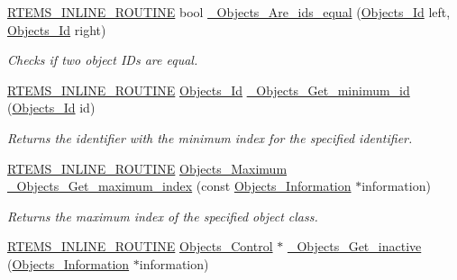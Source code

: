 \begin{DoxyCompactItemize}
\mbox{\hyperlink{group__RTEMSScoreBaseDefs_gac216239df231d5dbd15e3520b0b9313f}{R\+T\+E\+M\+S\+\_\+\+I\+N\+L\+I\+N\+E\+\_\+\+R\+O\+U\+T\+I\+NE}} bool \mbox{\hyperlink{group__RTEMSScoreObject_gaba59419fd15c39c93eedbaba5788de05}{\+\_\+\+Objects\+\_\+\+Are\+\_\+ids\+\_\+equal}} (\mbox{\hyperlink{group__RTEMSScoreObject_ga5821f52a51072941bdd603e542d0863e}{Objects\+\_\+\+Id}} left, \mbox{\hyperlink{group__RTEMSScoreObject_ga5821f52a51072941bdd603e542d0863e}{Objects\+\_\+\+Id}} right)
\begin{DoxyCompactList}\small\item\em Checks if two object I\+Ds are equal. \end{DoxyCompactList}\item 
\mbox{\hyperlink{group__RTEMSScoreBaseDefs_gac216239df231d5dbd15e3520b0b9313f}{R\+T\+E\+M\+S\+\_\+\+I\+N\+L\+I\+N\+E\+\_\+\+R\+O\+U\+T\+I\+NE}} \mbox{\hyperlink{group__RTEMSScoreObject_ga5821f52a51072941bdd603e542d0863e}{Objects\+\_\+\+Id}} \mbox{\hyperlink{group__RTEMSScoreObject_gaaa126abc5988d998acc3b6c9f39c3bee}{\+\_\+\+Objects\+\_\+\+Get\+\_\+minimum\+\_\+id}} (\mbox{\hyperlink{group__RTEMSScoreObject_ga5821f52a51072941bdd603e542d0863e}{Objects\+\_\+\+Id}} id)
\begin{DoxyCompactList}\small\item\em Returns the identifier with the minimum index for the specified identifier. \end{DoxyCompactList}\item 
\mbox{\hyperlink{group__RTEMSScoreBaseDefs_gac216239df231d5dbd15e3520b0b9313f}{R\+T\+E\+M\+S\+\_\+\+I\+N\+L\+I\+N\+E\+\_\+\+R\+O\+U\+T\+I\+NE}} \mbox{\hyperlink{group__RTEMSScoreObject_gaa2735357885ec7d7157c32f3f835f9ae}{Objects\+\_\+\+Maximum}} \mbox{\hyperlink{group__RTEMSScoreObject_gadf825a94fecd0945a4368e503e274bfd}{\+\_\+\+Objects\+\_\+\+Get\+\_\+maximum\+\_\+index}} (const \mbox{\hyperlink{structObjects__Information}{Objects\+\_\+\+Information}} $\ast$information)
\begin{DoxyCompactList}\small\item\em Returns the maximum index of the specified object class. \end{DoxyCompactList}\item 
\mbox{\hyperlink{group__RTEMSScoreBaseDefs_gac216239df231d5dbd15e3520b0b9313f}{R\+T\+E\+M\+S\+\_\+\+I\+N\+L\+I\+N\+E\+\_\+\+R\+O\+U\+T\+I\+NE}} \mbox{\hyperlink{structObjects__Control}{Objects\+\_\+\+Control}} $\ast$ \mbox{\hyperlink{group__RTEMSScoreObject_ga65145acdbdabd9d924117aac97f3e08e}{\+\_\+\+Objects\+\_\+\+Get\+\_\+inactive}} (\mbox{\hyperlink{structObjects__Information}{Objects\+\_\+\+Information}} $\ast$information)

\end{DoxyCompactItemize}
